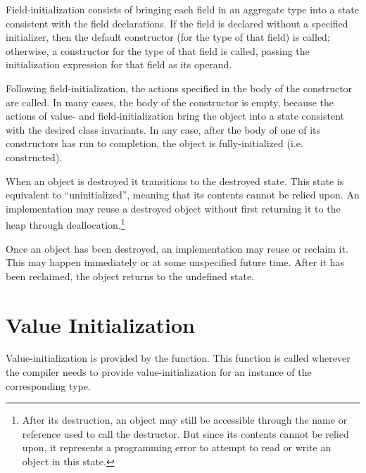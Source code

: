 Field-initialization consists of bringing each field in an aggregate type into a
state consistent with the field declarations.  If the field is declared without
a specified initializer, then the default constructor (for the type of that
field) is called; otherwise, a constructor for the type of that field is called,
passing the initialization expression for that field as its operand.

Following field-initialization, the actions specified in the body of the
constructor are called.  In many cases, the body of the constructor is empty,
because the actions of value- and field-initialization bring the object into a
state consistent with the desired class invariants.  In any case, after the body
of one of its constructors has run to completion, the object is
fully-initialized (i.e. constructed).

When an object is destroyed it transitions to the destroyed state.  This state
is equivalent to ``uninitialized'', meaning that its contents cannot be relied
upon.  An implementation may reuse a destroyed object without first returning it
to the heap through deallocation.\footnote{After its destruction, an object may
  still be accessible through the name or reference used to call the
  destructor.  But since its contents cannot be relied upon, it represents a
  programming error to attempt to read or write an object in this state.}

Once an object has been destroyed, an implementation may reuse or reclaim it.
This may happen immediately or at some unspecified future time.  After it has
been reclaimed, the object returns to the undefined state.



\section{Value Initialization}

Value-initialization is provided by the  function.
This function is called wherever the compiler needs to provide value-initialization
for an instance of the corresponding type.  

